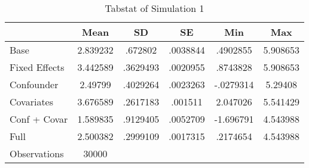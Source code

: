 \begin{table}[htbp]\centering
\def\sym#1{\ifmmode^{#1}\else\(^{#1}\)\fi}
\caption{Tabstat of Simulation 1}
\begin{tabular}{l*{1}{ccccc}}
\hline\hline
                    &        Mean&          SD&          SE&         Min&         Max\\
\hline
Base                &    2.839232&     .672802&    .0038844&    .4902855&    5.908653\\
Fixed Effects       &    3.442589&    .3629493&    .0020955&    .8743828&    5.908653\\
Confounder          &     2.49799&    .4029264&    .0023263&   -.0279314&     5.29408\\
Covariates          &    3.676589&    .2617183&     .001511&    2.047026&    5.541429\\
Conf + Covar        &    1.589835&    .9129405&    .0052709&   -1.696791&    4.543988\\
Full                &    2.500382&    .2999109&    .0017315&    .2174654&    4.543988\\
\hline
Observations        &       30000&            &            &            &            \\
\hline\hline
\end{tabular}
\end{table}
